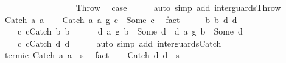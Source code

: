 \begin{isabellebody}
\ \ \ \ \ \ \isamarkupfalse%
\isanewline
\ \ \ \ \isamarkupfalse%
\isanewline
\ \ \isamarkupfalse%
\isanewline
{}\isamarkupfalse%
\isanewline
\ \ \isamarkupfalse%
\ Throw\ \isamarkupfalse%
\ {\isacharquery}case\isanewline
\ \ \ \ \isamarkupfalse%
\ {\isacharparenleft}auto\ simp\ add{\isacharcolon}\ inter{\isacharunderscore}guards{\isacharunderscore}Throw{\isacharparenright}\isanewline
{}\isamarkupfalse%
\isanewline
\ \ \isamarkupfalse%
\ {\isacharparenleft}Catch\ a{}\ a{}{\isacharparenright}\isanewline
\ \ \isamarkupfalse%
\ {\isachardoublequoteopen}{\isacharparenleft}Catch\ a{}\ a{}\ {\isasyminter}\isactrlsub g\ c{}{\isacharparenright}\ {\isacharequal}\ Some\ c{\isachardoublequoteclose}\ \isamarkupfalse%
\ fact\isanewline
\ \ \isamarkupfalse%
\ \isamarkupfalse%
\ b{}\ b{}\ d{}\ d{}\ \isanewline
\ \ \ \ c{}{\isacharcolon}\ {\isachardoublequoteopen}c{}{\isacharequal}Catch\ b{}\ b{}{\isachardoublequoteclose}\ \ \isanewline
\ \ \ \ d{}{\isacharcolon}\ {\isachardoublequoteopen}{\isacharparenleft}a{}\ {\isasyminter}\isactrlsub g\ b{}{\isacharparenright}\ {\isacharequal}\ Some\ d{}{\isachardoublequoteclose}\ \ d{}{\isacharcolon}\ {\isachardoublequoteopen}{\isacharparenleft}a{}\ {\isasyminter}\isactrlsub g\ b{}{\isacharparenright}\ {\isacharequal}\ Some\ d{}{\isachardoublequoteclose}\ \isanewline
\ \ \ \ c{\isacharcolon}\ {\isachardoublequoteopen}c{\isacharequal}Catch\ d{}\ d{}{\isachardoublequoteclose}\isanewline
\ \ \ \ \isamarkupfalse%
\ {\isacharparenleft}auto\ simp\ add{\isacharcolon}\ inter{\isacharunderscore}guards{\isacharunderscore}Catch{\isacharparenright}\isanewline
\ \ \isamarkupfalse%
\ termi{\isacharunderscore}c{}{\isacharcolon}\ {\isachardoublequoteopen}{\isasymGamma}{\isasymturnstile}Catch\ a{}\ a{}\ {\isasymdown}\ s{\isachardoublequoteclose}\ \isamarkupfalse%
\ fact\isanewline
\ \ \isamarkupfalse%
\ {\isachardoublequoteopen}{\isasymGamma}{\isasymturnstile}Catch\ d{}\ d{}\ {\isasymdown}\ s{\isachardoublequoteclose}\isanewline

\end{isabellebody}
